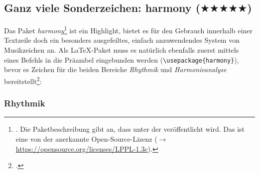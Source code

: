 %
%
%




\subsection{Ganz viele Sonderzeichen: harmony ($\bigstar\bigstar\bigstar\bigstar\bigstar$)}

Das Paket \textit{harmony}\footnote{\cite[vgl.][\nopage wp]{CtanHarmony2018a}.
Die Paketbeschreibung gibt an, dass  unter der  veröffentlicht wird. Das ist eine von der  anerkannte
Open-Source-Lizenz ($\rightarrow$ \href{https://opensource.org/licenses/LPPL-1.3c}
{https://opensource.org/licenses/LPPL-1.3c}).} ist ein Highlight, bietet es für
den Gebrauch innerhalb einer Textzeile doch ein besonders ausgefeiltes, einfach
anzuwendendes System von Musikzeichen an. Als \LaTeX-Paket muss es natürlich
ebenfalls zuerst mittels eines Befehls in die Präambel eingebunden werden
(\small \texttt{\textbackslash{usepackage\{harmony\}}}), bevor es Zeichen für die beiden
Bereiche \textit{Rhythmik} und \textit{Harmonieanalyse}
bereitstellt\footcite[Für einen vollen Überblick über den Zeichenvorrat und die
Kombinationsmöglichkeiten vgl.][4ff]{WegWeg2007a}:

\subsubsection{\small Rhythmik}

